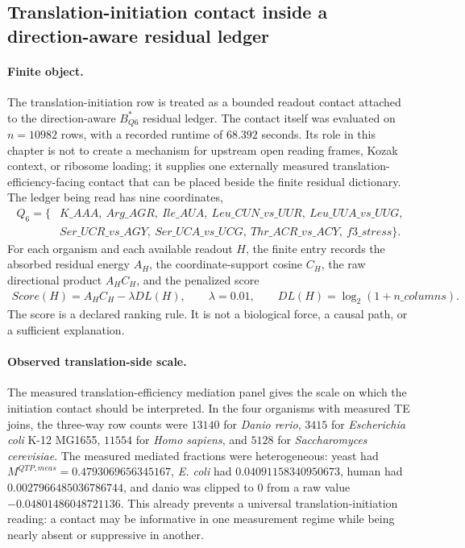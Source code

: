 
\subsection{Translation-initiation contact inside a direction-aware residual ledger}
\label{sec:bioreality-uorf-kozak-endogenous-te-ribonn}

\paragraph{Finite object.}
The translation-initiation row is treated as a bounded readout contact attached to the direction-aware $B^*_{Q6}$ residual ledger.  The contact itself was evaluated on $n=10982$ rows, with a recorded runtime of $68.392$ seconds.  Its role in this chapter is not to create a mechanism for upstream open reading frames, Kozak context, or ribosome loading; it supplies one externally measured translation-efficiency-facing contact that can be placed beside the finite residual dictionary.  The ledger being read has nine coordinates,
$$
\begin{aligned}
Q_6 = \{&K\_AAA,\ Arg\_AGR,\ Ile\_AUA,\ Leu\_CUN\_vs\_UUR,\ Leu\_UUA\_vs\_UUG,\\
&Ser\_UCR\_vs\_AGY,\ Ser\_UCA\_vs\_UCG,\ Thr\_ACR\_vs\_ACY,\ f3\_stress\}.
\end{aligned}
$$
For each organism and each available readout $H$, the finite entry records the absorbed residual energy $A_H$, the coordinate-support cosine $C_H$, the raw directional product $A_H C_H$, and the penalized score
$$
\begin{aligned}
Score(H)=A_H C_H-\lambda DL(H),\qquad \lambda=0.01,\qquad DL(H)=\log_2(1+n\_{columns}).
\end{aligned}
$$
The score is a declared ranking rule.  It is not a biological force, a causal path, or a sufficient explanation.

\paragraph{Observed translation-side scale.}
The measured translation-efficiency mediation panel gives the scale on which the initiation contact should be interpreted.  In the four organisms with measured TE joins, the three-way row counts were $13140$ for \emph{Danio rerio}, $3415$ for \emph{Escherichia coli} K-12 MG1655, $11554$ for \emph{Homo sapiens}, and $5128$ for \emph{Saccharomyces cerevisiae}.  The measured mediated fractions were heterogeneous: yeast had $M^{QTP,meas}=0.4793069656345167$, \emph{E. coli} had $0.04091158340950673$, human had $0.0027966485036786744$, and danio was clipped to $0$ from a raw value $-0.04801486048721136$.  This already prevents a universal translation-initiation reading: a contact may be informative in one measurement regime while being nearly absent or suppressive in another.

